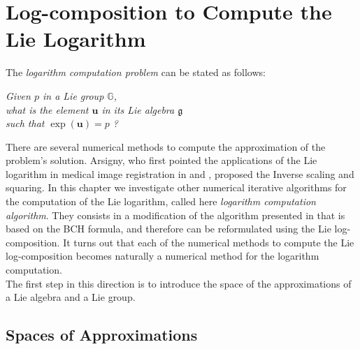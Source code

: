\chapter{Log-composition to Compute the Lie Logarithm}\label{ch:log_algorithm}

%

\noindent
The \emph{logarithm computation problem} can be stated as follows:
\begin{center}
\emph{
	Given $p$ in a Lie group $\mathbb{G}$, \\ 
	what is the element $\mathbf{u}$ in its Lie algebra $\mathfrak{g}$ \\
	such that $\exp(\mathbf{u}) = p$ ?  
}
\end{center}
There are several numerical methods to compute the approximation of the problem's solution. Arsigny, who first pointed the applications of the Lie logarithm in medical image registration in \cite{Arsigny:MRM:06} and \cite{arsigny2006bi}, proposed the Inverse scaling and squaring. In this chapter we investigate other numerical iterative algorithms for the computation of the Lie logarithm, called here \emph{logarithm computation algorithm}. They consists in a modification of the algorithm presented in \cite{Bossa:08} that is based on the BCH formula, and therefore can be reformulated using the Lie log-composition. 
It turns out that each of the numerical methods to compute the Lie log-composition becomes naturally a numerical method for the logarithm computation.\\
The first step in this direction is to introduce the space of the approximations of a Lie algebra and a Lie group.


\section{Spaces of Approximations}\label{se:space_of_approximation}

